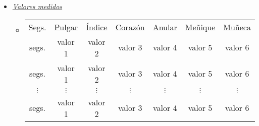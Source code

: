 \begin{itemize} [label=$ \rhd $]
	\item \textit{\underline{Valores medidos}}  
	\begin{itemize} [label=]  \addtolength{\itemsep}{-5mm} %
		\item  \vspace{-6mm}	
		\begin{table}[H]
			\hspace{2cm}
			\renewcommand{\arraystretch}{2}
			\begin{tabular}{ccccccc}
				\underline{Segs.} & \underline{Pulgar} & \underline{Índice} & \underline{Corazón} & \underline{Anular} & \underline{Meñique} & \underline{Muñeca}  \\
				segs.& valor 1 & valor 2 & valor 3 & valor 4 & valor 5 & valor 6  \\
				segs.& valor 1 & valor 2 & valor 3 & valor 4 & valor 5 & valor 6  \\
				$\vdots$ & $\vdots$ & $\vdots$ & $\vdots$ & $\vdots$ & $\vdots$ & $\vdots$  \\
				segs.& valor 1 & valor 2 & valor 3 & valor 4 & valor 5 & valor 6  \\
			\end{tabular} 
		\end{table}			
	\end{itemize}
\end{itemize}